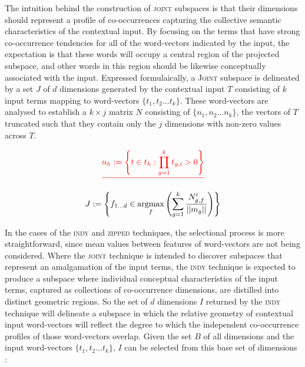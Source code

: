 The intuition behind the construction of \textsc{joint} subspaces is that their dimensions should represent a profile of co-occurrences capturing the collective semantic characteristics of the contextual input.  By focusing on the terms that have strong co-occurrence tendencies for all of the word-vectors indicated by the input, the expectation is that these words will occupy a central region  of the projected subspace, and other words in this region should be likewise conceptually associated with the input.  Expressed formulaically, a \textsc{Joint} subspace is delineated by a set $J$ of $d$ dimensions generated by the contextual input $T$ consisting of $k$ input terms mapping to word-vectors $\{t_1, t_2... t_k\}$.  These word-vectors are analysed to establish a $k \times j$ matrix $N$ consisting of $\{n_1, n_2... n_k\}$, the vectors of $T$ truncated such that they contain only the $j$ dimensions with non-zero values across $T$.  

\begin{equation} \label{eq:subset}
\del{n_h := \left \{t \in t_h: \prod_{g=1}^{k} t_{g,i} > 0\right \}}
\end{equation}


\begin{equation}
J := \left \{ f_{1...d} \in \operatorname*{argmax}_{f}\left(\sum_{g=1}^{k} \frac{N'_{g,f}}{||m_g||}\right)\right \}
\end{equation}

\noindent In the cases of the \textsc{indy} and \textsc{zipped} techniques, the selectional process is more straightforward, since mean values between features of word-vectors are not being considered.  Where the \textsc{joint} technique is intended to discover subspaces that represent an amalgamation of the input terms, the \textsc{indy} technique is expected to produce a subspace where individual conceptual characteristics of the input terms, captured as collections of co-occurrence dimensions, are distilled into distinct geometric regions.  So the set of $d$ dimensions $I$ returned by the \textsc{indy} technique will delineate a subspace in which the relative geometry of contextual input word-vectors will reflect the degree to which the independent co-occurrence profiles of those word-vectors overlap.  Given the set $B$ of all dimensions and the input word-vectors $\{t_1, t_2... t_k\}$, $I$ can be selected from this base set of dimensions :

